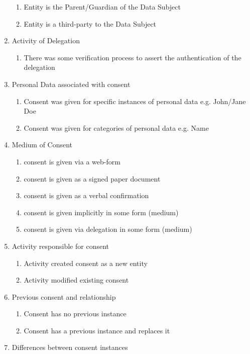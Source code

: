 \begin{enumerate}
  \begin{enumerate}
  \item
    Entity is the Parent/Guardian of the Data Subject
  \item
    Entity is a third-party to the Data Subject
  \end{enumerate}
\item
  Activity of Delegation

  \begin{enumerate}
  \item There was some verification process to assert the authentication of
    the delegation
  \end{enumerate}
\item
  Personal Data associated with consent

  \begin{enumerate}
  \item
    Consent was given for specific instances of personal data e.g. John/Jane Doe
  \item
    Consent was given for categories of personal data e.g. Name
  \end{enumerate}
\item
  Medium of Consent

  \begin{enumerate}
  \item
    consent is given via a web-form
  \item
    consent is given as a signed paper document
  \item
    consent is given as a verbal confirmation
  \item
    consent is given implicitly in some form (medium)
  \item
    consent is given via delegation in some form (medium)
  \end{enumerate}
\item
  Activity responsible for consent

  \begin{enumerate}
  \item
    Activity created consent as a new entity
  \item
    Activity modified existing consent
  \end{enumerate}
\item
  Previous consent and relationship

  \begin{enumerate}
  \item
    Consent has no previous instance
  \item
    Consent has a previous instance and replaces it
  \end{enumerate}
\item
  Differences between consent instances


\end{enumerate}
